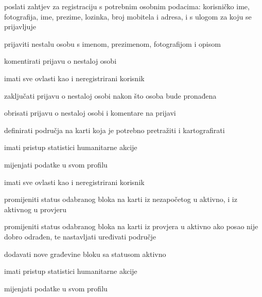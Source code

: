 			
			\begin{packed_enum}
				\item  {}
				
				\begin{packed_enum}
					
					\item poslati zahtjev za registraciju s potrebnim osobnim podacima: korisničko ime, fotografija, ime, prezime, lozinka, broj mobitela i adresa, i s ulogom za koju se prijavljuje
					\item prijaviti nestalu osobu s imenom, prezimenom, fotografijom i opisom
					\item komentirati prijavu o nestaloj osobi
					
					
				\end{packed_enum}
			
				\item  {}
				
				\begin{packed_enum}

                        \item imati sve ovlasti kao i neregistrirani korisnik
					\item zaključati prijavu o nestaloj osobi nakon što osoba bude pronađena
					\item obrisati prijavu o nestaloj osobi i komentare na prijavi
					\item definirati područja na karti koja je potrebno pretražiti i kartografirati
					\item imati pristup statistici humanitarne akcije
					\item mijenjati podatke u svom profilu

					
				\end{packed_enum}
				
				\item  {}
				
				\begin{packed_enum}
    
					\item imati sve ovlasti kao i neregistrirani korisnik
					\item promijeniti status odabranog bloka na karti iz nezapočetog u aktivno, i iz aktivnog u provjeru
					\item promijeniti status odabranog bloka na karti iz provjera u aktivno ako posao nije dobro odrađen, te nastavljati uređivati područje
					\item dodavati nove građevine bloku sa statusom aktivno
					\item imati pristup statistici humanitarne akcije
					\item mijenjati podatke u svom profilu



\end{packed_enum}
\end{packed_enum}
